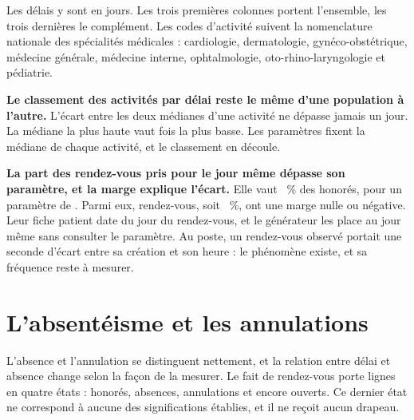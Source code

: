 Les délais y sont en jours. Les trois premières colonnes portent l'ensemble, les trois dernières le
complément. Les codes d'activité suivent la nomenclature nationale des spécialités médicales
\cite{s30} :  cardiologie, 
dermatologie,  gynéco-obstétrique,
 médecine générale, 
médecine interne,  ophtalmologie,
 oto-rhino-laryngologie et
 pédiatrie.

\textbf{Le classement des activités par délai reste le même d'une population à
l'autre.} L'écart entre les deux médianes d'une activité ne dépasse jamais un jour. La médiane la
plus haute vaut  fois la plus basse. Les paramètres fixent la
médiane de chaque activité, et le classement en découle.

\textbf{La part des rendez-vous pris pour le jour même dépasse son paramètre, et la
marge explique l'écart.} Elle vaut ~\% des honorés, pour un paramètre
de . Parmi eux,  rendez-vous, soit
~\%, ont une marge nulle ou négative. Leur fiche patient
date du jour du rendez-vous, et le générateur les place au jour même sans consulter le paramètre. Au
poste, un rendez-vous observé portait une seconde d'écart entre sa création et son
heure : le phénomène existe, et sa fréquence reste à mesurer.

\section{L'absentéisme et les annulations}

L'absence et l'annulation se distinguent nettement, et la relation entre délai et absence change
selon la façon de la mesurer. Le fait de rendez-vous porte  lignes
en quatre états :  honorés, 
absences,  annulations et  encore ouverts. Ce
dernier état ne correspond à aucune des  significations établies, et il ne reçoit aucun drapeau.

